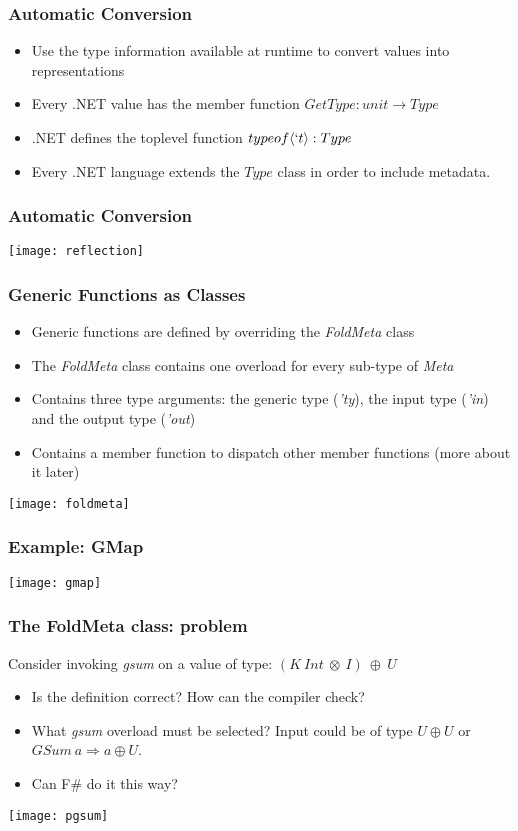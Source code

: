 \documentclass{beamer}
\begin{document}
\begin{frame}

  \frametitle{Automatic Conversion}

  \begin{itemize}

  \item Use the type information available at runtime to convert values into representations
  \item Every .NET value has the member function $GetType : unit \rightarrow Type$
  \item .NET defines the toplevel function $typeof\langle `t \rangle : Type$
  \item Every .NET language extends the $Type$ class in order to
    include metadata.
    
  \end{itemize}
\end{frame}

\begin{frame}
  \frametitle{Automatic Conversion}
  \centering\texttt{[image: reflection]}
\end{frame}

\begin{frame}

  \frametitle{Generic Functions as Classes}

  \begin{itemize}
  \item Generic functions are defined by overriding the
    \emph{FoldMeta} class
  \item The \emph{FoldMeta} class contains one overload for every
    sub-type of \emph{Meta}
  \item Contains three type arguments: the generic type (\emph{'ty}),
    the input type (\emph{'in}) and the output type (\emph{'out})
  \item Contains a member function to dispatch other member functions
    (more about it later)
  \end{itemize}
  
  \centering\texttt{[image: foldmeta]}
  
\end{frame}

\begin{frame}
  \frametitle{Example: GMap}
  \texttt{[image: gmap]}
\end{frame}

\begin{frame}
  \frametitle{The FoldMeta class: problem} Consider invoking
  \emph{gsum} on a value of type: $(K\ Int\ \otimes\ I)\ \oplus\ U$
  \begin{itemize}
  \item Is the definition correct? How can the compiler check?
  \item What \emph{gsum} overload must be selected? Input could be of
    type $U \oplus U$ or $GSum\ a \Rightarrow a \oplus U$.
  \item Can F\# do it this way?
  \end{itemize}
  \centering\texttt{[image: pgsum]}
\end{frame}
\end{document}
